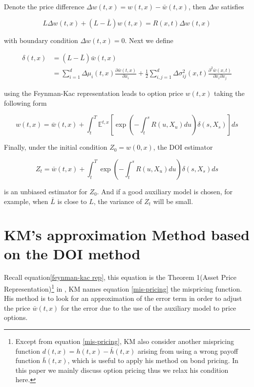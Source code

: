 Denote the price difference $\Delta w(t,x) = w(t,x) - \bar{w}(t,x)$, then $\Delta w$ satisfies 

\begin{equation}
    L \Delta w(t, x)+ (L-\bar{L}) w(t,x)=R(x, t) \Delta w(t, x)
\end{equation}

\noindent with boundary condition $\Delta w(t,x) = 0$. Next we define

\begin{equation}\label{mis-pricing}
    \begin{aligned}
        \delta(t,x) &= (L-\bar{L}) \bar{w}(t,x) \\
        &=\sum_{i=1}^{d} \Delta \mu_{i}(t,x) \frac{\partial \bar{w}(t,x)}{\partial x_{i}}+\frac{1}{2} \sum_{i, j=1}^{d} \Delta \sigma_{i j}^{2}(x, t) \frac{\partial^{2} \bar{w}(x,t)}{\partial x_{i} \partial x_{j}}
    \end{aligned}
\end{equation}

\noindent using the Feynman-Kac representation leads to option price $w(t,x)$ taking the following form

\begin{equation}\label{feynman-kac rep}
        w(t, x)=\bar{w}(t,x)+\int_{t}^{T} \mathbb{E}^{t,x}\left[\exp \left(-\int_{t}^{s} R(u, X_u) d u\right) \delta(s,X_s)\right] d s
\end{equation}

\noindent Finally, under the initial condition $Z_0 = w(0,x)$, the DOI estimator

\begin{equation}
        Z_t =\bar{w}(t, x)+\int_{t}^{T} \exp \left(-\int_{t}^{s} R(u, X_u) d u\right) \delta(s,X_s)d s
\end{equation}

\noindent is an unbiased estimator for $Z_0$. And if a good auxiliary model is chosen, for example, when $\bar{L}$ is close to $L$, the variance of $Z_t$ will be small.

\section{KM's approximation Method based on the DOI method}
\label{sec: 2.2}

Recall equation\eqref{feynman-kac rep}, this equation is the Theorem 1(Asset Price Representation)\footnote{Except from equation \eqref{mis-pricing}, KM also consider another mispricing function $d(t,x)=h(t,x)-\bar{h}(t,x)$ arising from using a wrong payoff function $\bar{h}(t,x)$, which is useful to apply his method on bond pricing. In this paper we mainly discuss option pricing thus we relax his condition here.} in \cite{kristensen_adding_2011}, KM names equation \eqref{mis-pricing} the mispricing function. His method is to look for an approximation of the error term in order to adjust the price $\bar{w}(t,x)$ for the error due to the use of the auxiliary model to price options.

